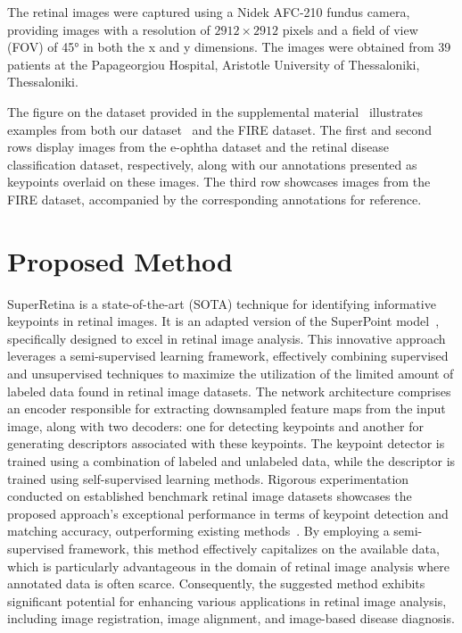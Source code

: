\documentclass[10pt,twocolumn,letterpaper]{article}
\begin{document}
The retinal images were captured using a Nidek AFC-210 fundus camera, providing images with a resolution of $2912 \times 2912$ pixels and a field of view (FOV) of 45° in both the x and y dimensions. The images were obtained from 39 patients at the Papageorgiou Hospital, Aristotle University of Thessaloniki, Thessaloniki.

The figure on the dataset provided in the supplemental material~\cite{Authors14} illustrates examples from both our dataset~\cite{medal2023} and the FIRE dataset. The first and second rows display images from the e-ophtha dataset and the retinal disease classification dataset, respectively, along with our annotations presented as keypoints overlaid on these images. The third row showcases images from the FIRE dataset, accompanied by the corresponding annotations for reference.

















\section{Proposed Method}
\label{sec:proposed}

SuperRetina \cite{liu2022semi} is a state-of-the-art (SOTA) technique for identifying informative keypoints in retinal images. It is an adapted version of the SuperPoint model~\cite{detone2018superpoint}, specifically designed to excel in retinal image analysis. This innovative approach leverages a semi-supervised learning framework, effectively combining supervised and unsupervised techniques to maximize the utilization of the limited amount of labeled data found in retinal image datasets. The network architecture comprises an encoder responsible for extracting downsampled feature maps from the input image, along with two decoders: one for detecting keypoints and another for generating descriptors associated with these keypoints. The keypoint detector is trained using a combination of labeled and unlabeled data, while the descriptor is trained using self-supervised learning methods. Rigorous experimentation conducted on established benchmark retinal image datasets showcases the proposed approach's exceptional performance in terms of keypoint detection and matching accuracy, outperforming existing methods~\cite{fire_dataset}. By employing a semi-supervised framework, this method effectively capitalizes on the available data, which is particularly advantageous in the domain of retinal image analysis where annotated data is often scarce. Consequently, the suggested method exhibits significant potential for enhancing various applications in retinal image analysis, including image registration, image alignment, and image-based disease diagnosis.
\end{document}
